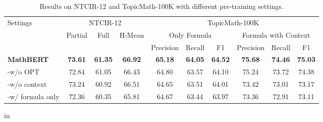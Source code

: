 \documentclass{article}
\begin{document}
\begin{table*}[!t]
\begin{center}
\begin{tabular}{lccccccccc}
\toprule
\multirow{3}{*}{Settings} & \multicolumn{3}{c}{NTCIR-12} & \multicolumn{6}{c}{TopicMath-100K}  \\
& \multirow{2}{*}{Partial} & \multirow{2}{*}{Full} & \multirow{2}{*}{H-Mean} & \multicolumn{3}{c}{Only   Formula} & \multicolumn{3}{c}{Formula   with Context} \\
&&&& Precision    & Recall   & F1       & Precision      & Recall      & F1    \\
\hline
\textbf{MathBERT}          & \textbf{73.61}                              & \textbf{61.35}                          & \textbf{66.92}                         & \textbf{65.18}       & \textbf{64.05}   & \textbf{64.52}   & \textbf{75.68}         & \textbf{74.46}      & \textbf{75.03}      \\
-w/o OPT          & 72.84                              & 61.05                          & 66.43                         & 64.80       & 63.57   & 64.10   & 75.24         & 73.72      & 74.38      \\
-w/o context   & 73.24 & 60.92 & 66.51 &	64.65 & 63.51 & 64.01 &	73.42 & 73.01 & 73.17 \\
-w/ formula only  & 72.36                              & 60.35                          & 65.81                         & 64.67       & 63.44   & 63.97   & 73.36         & 72.91      & 73.11  \\   
\bottomrule
\end{tabular}
\end{center}
\vskip -0.15in
\caption{Results on NTCIR-12 and TopicMath-100K with different pre-training settings.}
\label{tab:ablation}
 in
\end{table*}
\end{document}
